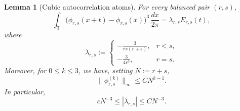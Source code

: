 \documentclass[10pt,a4paper]{amsart}
\newtheorem{lemma}[theorem]{Lemma}
\newcommand{\T}{\mathbb T}
\begin{document}
\begin{lemma}[Cubic autocorrelation atoms]\label{lem:cubic-atoms}
For every balanced pair $(r,s)$,
\begin{equation}\label{eq:cubic-atom}
 \int_\T
 \big(\phi_{r,s}(x+t)-\phi_{r,s}(x)\big)^3\,\frac{dx}{2\pi}
 =\lambda_{r,s}E_{r,s}(t),
\end{equation}
where
\begin{equation}\label{eq:lambda-rs}
 \lambda_{r,s}:=
 \begin{cases}
 \displaystyle-\frac{3}{rs(r+s)},&r<s,\\[1.5ex]
 \displaystyle-\frac{3}{4r^3},&r=s.
 \end{cases}
\end{equation}
Moreover, for $0\leq k\leq3$, we have, setting $N:=r+s$,
\begin{equation}\label{eq:phi-derivative-bound}
 \|\phi_{r,s}^{(k)}\|_\infty\leq C N^{k-1}.
\end{equation}
In particular,
\begin{equation}\label{eq:lambda-comparable}
 cN^{-3}\leq|\lambda_{r,s}|\leq CN^{-3}.
\end{equation}
\end{lemma}
\end{document}
